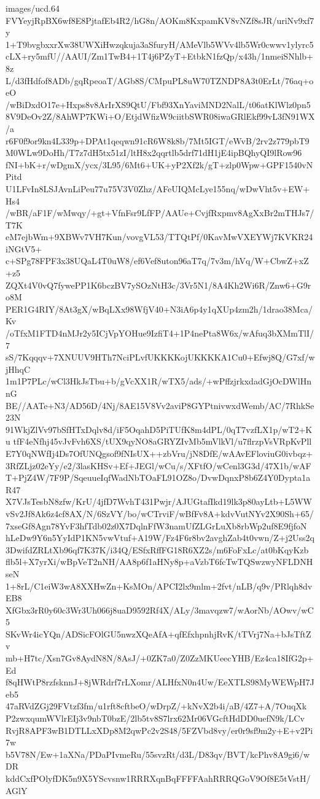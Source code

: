 \begin{filecontents*}{images/ucd.64}
FVYeyjRpBX6wf8E8PjtafEb4R2/hG8n/AOKm8KxpamKV8vNZf8sJR/uriNv9xf7y
1+T9bvgbxxrXw38UWXiHwzqkuja3aSfuryH/AMeVlb5WVv4lb5Wr0cwwv1ylyrc5
cLX+ry5mfU//AAUI/Zm1TwB4+1T4j6PZyT+EtbkN1fzQp/x43h/1nmeiSNhlb+8z
L/d3fHdfof8ADb/gqRpeoaT/AGb8S/CMpuPL8uW70TZNDP8A3t0ErLt/76aq+oeO
/wBiDxdO17e+Hxps8v8ArIrXS9QtU/Fbf93XnYaviMND2NalL/t06atKlWlz0pn5
8V9DeOv2Z/8AhWP7KWi+O/EtjdWfizW9ciitbSWR08iwaGRlEkf99vL3fN91WX/a
r6F0f9or9kn4L339p+DPAt1qeqwn91cR6W8k8b/7Mt5IGT/eWvB/2rv2z779pbT9
M0WLw9DoHh/T7z7dH5tx51zI/ltH8x2qqrtlb5drf71dH1jE4ipBQhyQI9lRow96
fNI+bK+r/wDgmX/ycx/3L95/6Mt6+UK+yP2Xf2k/gT+zlp0Wpw+GPF1540vNPitd
U1LFvIn8LSJAvnLiPeu77u75V3V0Zhz/AFeUIQMcLye155nq/wDwVht5v+EW+Hs4
/wBR/aF1F/wMwqy/+gt+VfnFsr9LfFP/AAUe+CvjfRxpmv8AgXxBr2mTHJs7/T7K
eM7ejbWm+9XBWv7VH7Kun/vovgVL53/TTQtPf/0KavMwVXEYWj7KVKR24iNGtV5+
c+SPg78FPF3x38UQaL4T0uW8/ef6Vef8uton96aT7q/7v3m/hVq/W+CbwZ+xZ+z5
ZQXt4V0vQ7fywePP1K6bczBV7ySOzNtH3c/3Vr5N1/8A4Kh2Wi6R/Znw6+G9ro8M
PER1G4RIY/8At3gX/wBqLXx98WfjV40+N3iA6p4y1qXUp4zm2h/1drao38Mca/Kv
/oTfxM1FTD4nMJr2y5ICjVpYOHue9IzfiT4+1P4nePta8W6x/wAfuq3bXMmTlI/7
sS/7Kqqqv+7XNUUV9HTh7NciPLvfUKKKKojUKKKKA1Cu0+Efwj8Q/G7xf/wjHhqC
1m1P7PLc/wCl3HkJsTbu+b/gVcXX1R/wTX5/ads/+wPffzjrkxdadGjOcDWlHnnG
BE//AATe+N3/AD56D/4Nj/8AE15V8Vv2aviP8GYPtnivwxdWemb/AC/7RhkSe23N
91WkjZlVv97bSfHTxDqlv8d/iF5OqahD5PiTUfK8m4dPL/0qT7vzfLX1p/wT2+Ku
tfF4eNfhj45vJvFvh6XS/tUX9qyNO8aGRYZIvMb5mVlkVl/u7flrzpVsVRpKvPll
E7Y0qNWfIj4Ds7OfUNQgsof9fNIsUX++zbVru/jN8DfE/wAAvEFloviuG0ivbqz+
3RfZLjz02eYy/e2/3lasKHSv+Ef+JEGl/wCu/s/XFtfO/wCenl3G3d/47X1b/wAF
T+PjZ4W/7F9P/SqeuueIqfWadNbTOaFL91OZ8o/DvwDqnxP8b6Z4Y0Dypta1aR47
X7VJsTesbN8zfw/KrU/4jfD7WvhT431Pwjr/AJUGtafIkd19lk3p80ayLtb+L5WW
vSv2Jf8Ak6z4cf8AX/N/6SzVY/bo/wCTrviF/wBfFv8A+kdvVutNYv2X90Sh+65/
7xseGf8Agn78YvF3hfTdb02z0X7DqlnFfW3namUfZLGrLuXb8rbWp2uf8E9fjfoN
hLeDw9Y6n5YyIdP1KN5vwVtuf+A19W/Fz4F6r8bv2avghZab4t0vwn/Z+j2Uss2q
3DwifdZRLtXb96qf7K37K/i34Q/ESfxRffFG18R6XZ2s/m6FoFxLc/at0bKqyKzb
flb5l+X7yrXi/wBpVeT2nNH/AA8p6f1aHNy8p+aVzbT6fcTwTQSwzwyNFLDNHseN
1+8rL/C1eiW3wA8XXHwZn+KsMOn/APCI2lx9mlm+2fvt/nLB/q9v/PRlqh8dvEB8
XfGbx3rR0y60c3Wr3Uh066j8uaD9592Rf4X/ALy/3mavqzw7/wAorNb/AOwv/wC5
SKvWr4icYQn/ADSicFOlGU5nwzXQeAfA+qfEfxhpnhjRvK/tTVrj7Na+bJsTftZv
mb+H7tc/Xsn7Gv8AydN8N/8AsJ/+0ZK7a0/Z0ZzMKUeecYHB/Ez4ca18IfG2p+Ed
f8qHWtP8rzfsknnJ+8jWRdrf7rLXomr/ALHfxN0n4Uw/EeXTLS98MyWEWpH7Jeb5
47aRVdZGj29FVtzf3fm/u1rft8cftbeO/wDrpZ/+kNvX2b4i/aB/4Z7+A/7OuqXk
P2zwxqumWVlrEIj3v9nbT0bzE/2lb5tv8S7lrx62Mr06VGcftHdDD0uefN9k/LCv
RvjR8APF3wB1DTLLxXDp8M2qwPc2v2S48/5FZVbd8vy/er0r9sf9m2y+E+v2Pi7w
b5V78N/Ew+1aXNa/PDaPIvmeRu/55svzRt/d3L/D83qv/BVT/kcPhv8A9gi6/wDR
kddCxfPOlyfDK5n9X5YScvsnw1RRRXqnBqFFFFAahRRRQGoV9Of8E5tVstH/AGlY

\end{filecontents*}
